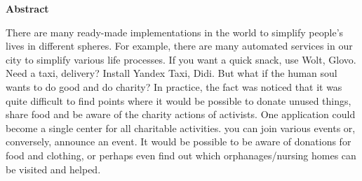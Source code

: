 \newpage
\pagestyle{plain}

\begin{center}
    \Large
    \textbf{Abstract}
\end{center}
There are many ready-made implementations in the world to simplify people's lives in different spheres. For example, there are many automated services in our city to simplify various life processes. If you want a quick snack, use Wolt, Glovo. Need a taxi, delivery? Install Yandex Taxi, Didi. But what if the human soul wants to do good and do charity? In practice, the fact was noticed that it was quite difficult to find points where it would be possible to donate unused things, share food and be aware of the charity actions of activists. One application could become a single center for all charitable activities. you can join various events or, conversely, announce an event. It would be possible to be aware of donations for food and clothing, or perhaps even find out which orphanages/nursing homes can be visited and helped.
